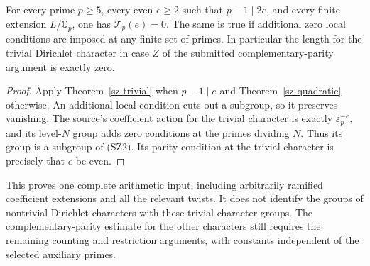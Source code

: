 \begin{corollary}\label{sz-exact-case}
For every prime $p\ge5$, every even $e\ge2$ such that
$p-1\mid2e$, and every finite extension $L/\mathbb Q_p$,
one has $\mathcal T_p(e)=0$. The same is true if additional
zero local conditions are imposed at any finite set of
primes. In particular the length for the trivial Dirichlet
character in case $Z$ of the submitted complementary-parity
argument is exactly zero.
\end{corollary}
\begin{proof}
Apply Theorem~\ref{sz-trivial} when $p-1\mid e$ and
Theorem~\ref{sz-quadratic} otherwise. An additional local
condition cuts out a subgroup, so it preserves vanishing.
The source's coefficient action for the trivial character
is exactly $\varepsilon_p^{-e}$, and its level-$N$ group
adds zero conditions at the primes dividing $N$.
Thus its group is a subgroup of (SZ2). Its parity condition
at the trivial character is precisely that $e$ be even.
\end{proof}

This proves one complete arithmetic input, including
arbitrarily ramified coefficient extensions and all the
relevant twists. It does not identify the groups of
nontrivial Dirichlet characters with these trivial-character
groups. The complementary-parity estimate for the other
characters still requires the remaining counting and
restriction arguments, with constants independent of the
selected auxiliary primes.


